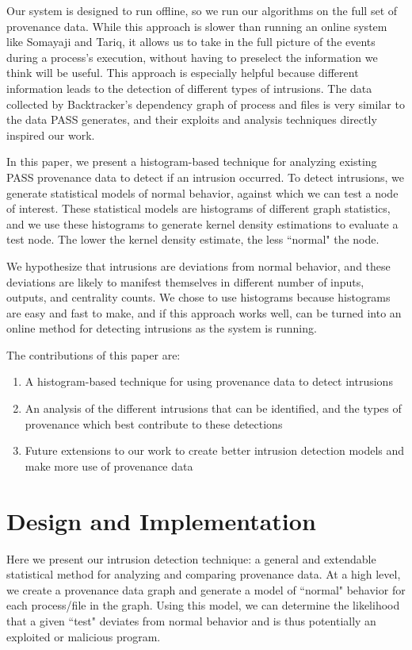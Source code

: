 \documentclass[10pt,twocolumn]{article}
\begin{document}
Our system is designed to run offline, so we run our algorithms on the full set of provenance data. While this approach is slower than running an online system like Somayaji and Tariq, it allows us to take in the full picture of the events during a process's execution, without having to preselect the information we think will be useful. This approach is especially helpful because different information leads to the detection of different types of intrusions. The data collected by Backtracker's dependency graph of process and files is very similar to the data PASS generates, and their exploits and analysis techniques directly inspired our work. 

In this paper, we present a histogram-based technique for analyzing existing PASS provenance data to detect if an intrusion occurred. To detect intrusions, we generate statistical models of normal behavior, against which we can test a node of interest. These statistical models are histograms of different graph statistics, and we use these histograms to generate kernel density estimations to evaluate a test node. The lower the kernel density estimate, the less ``normal" the node. 

We hypothesize that intrusions are deviations from normal behavior, and these deviations are likely to manifest themselves in different number of inputs,  outputs, and centrality counts. We chose to use histograms because histograms are easy and fast to make, and if this approach works well, can be turned into an online method for detecting intrusions as the system is running.

The contributions of this paper are:
\begin{enumerate}
\item A histogram-based technique for using provenance data to detect intrusions
\item An analysis of the different intrusions that can be identified, and the types of provenance which best contribute to these detections
\item Future extensions to our work to create better intrusion detection models and make more use of provenance data
\end{enumerate}


%

\section{Design and Implementation}
Here we present our intrusion detection technique: a general and extendable statistical method for analyzing and comparing provenance data. At a high level, we create a provenance data graph and generate a model of ``normal" behavior for each process/file in the graph. Using this model, we can determine the likelihood that a given ``test" deviates from normal behavior and is thus potentially an exploited or malicious program.
\end{document}
